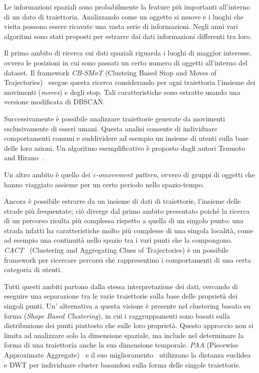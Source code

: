 Le informazioni spaziali sono probabilmente la feature più importanti all'interno di un dato di traiettoria.
Analizzando come un oggetto si muove e i luoghi che visita possono essere ricavate una vasta serie di informazioni.
Negli anni vari algoritmi sono stati proposti per estrarre dai dati informazioni differenti tra loro.

Il primo ambito di ricerca sui dati spaziali riguarda i luoghi di maggior interesse, ovvero le posizioni
in cui sono passati un certo numero di oggetti all'interno del dataset.
Il framework \textit{CB-SMoT} (Clusteing Based Stop and Moves of Trajectories)~\cite{palma2008clustering} esegue questa
ricerca considerando per ogni traiettoria l'insieme dei movimenti (\textit{moves}) e degli stop. Tali
caratteristiche sono estratte usando una versione modificata di DBSCAN\@.

Successivamente è possibile analizzare traiettorie generate da movimenti esclusivamente di esseri umani.
Questa analisi consente di individuare comportamenti comuni e suddividere ad esempio un insieme di
utenti sulla base delle loro azioni.
Un algoritmo esemplificativo è proposto dagli autori Tsumoto and Hirano~\cite{tsumoto2009behavior}.

Un altro ambito è quello dei \textit{c-omovement pattern}, ovvero di
gruppi di oggetti che hanno viaggiato assieme per un certo periodo nello spazio-tempo.

Ancora è possibile estrarre da un insieme di dati di traiettorie, l'insieme delle strade più
frequentate; ciò diverge dal primo ambito presentato poiché la ricerca di un percorso risulta
più complessa rispetto a quella di un singolo punto: una strada infatti ha caratteristiche molto
più complesse di una singola località, come ad esempio una continuità nello spazio tra i vari punti che
la compongono.
\textit{CACT}~\cite{hung2015clustering} (Clustering and Aggregating Clues of Trajectories) è un possibile framework per
ricercare percorsi che rappresentino i comportamenti di una certa categoria di utenti.

Tutti questi ambiti partono dalla stessa interpretazione dei dati, cercando di eseguire una separazione
tra le varie traiettorie sulla base delle proprietà dei singoli punti.
Un' alternativa a questa visione è presente nel clustering basato su forma (\textit{Shape Based Clustering}),
in cui i raggruppamenti sono basati sulla distribuzione dei punti piuttosto che sulle loro proprietà.
Questo approccio non si limita ad analizzare solo la dimensione spaziale, ma include nel determinare la
forma di una traiettoria anche la sua dimensione temporale.
\textit{PAA} (Piecewise Approximate Aggregate)~\cite{yanagisawa2003shape} e il suo miglioramento~\cite{yanagisawa2006clustering}
utilizzano la distanza euclidea e DWT per individuare cluster basandosi sulla forma delle singole traiettorie.
